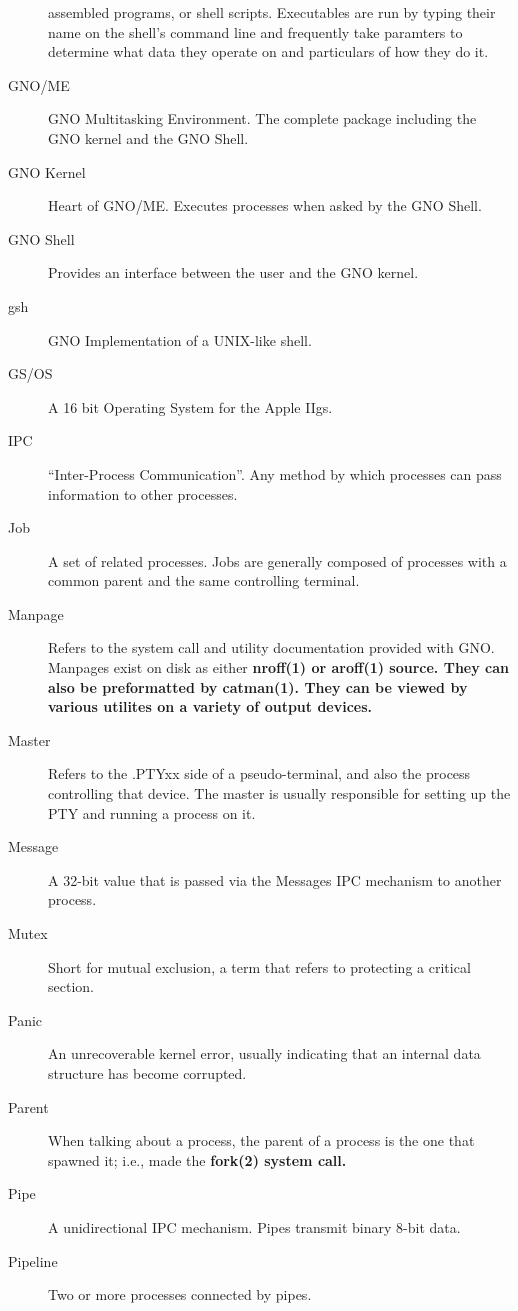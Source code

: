 \documentclass{report}
\begin{document}
\begin{description}
	assembled programs, or shell scripts. Executables are run by
	typing their name on the shell's command line and frequently take
	paramters to determine what data they operate on and particulars
	of how they do it.
\item[GNO/ME]
	GNO Multitasking Environment. The complete package including the GNO
	kernel and the GNO Shell.
\item[GNO Kernel]
	Heart of GNO/ME. Executes processes when asked by the GNO Shell.
\item[GNO Shell]
	Provides an interface between the user and the GNO kernel.
\item[gsh]
	GNO Implementation of a UNIX-like shell.
\item[GS/OS]
	A 16 bit Operating System for the Apple IIgs.
\item[IPC]
	``Inter-Process Communication''. Any method by which processes
	can pass information to other processes.
\item[Job]
	A set of related processes. Jobs are generally composed of
	processes with a common parent and the same controlling terminal.
\item[Manpage]
	Refers to the system call and utility documentation provided with GNO.
	Manpages exist on disk as either \bf nroff\rm(1) or \bf aroff\rm(1)
	source.  They can also be preformatted by \bf catman\rm(1).  They
	can be viewed by various utilites on a variety of output devices.
\item[Master]
	Refers to the .PTYxx side of a pseudo-terminal, and also
	the process controlling that device. The master is usually responsible
	for setting up the PTY and running a process on it.
\item[Message]
	A 32-bit value that is passed via the Messages IPC mechanism to
	another process.
\item[Mutex]
	Short for mutual exclusion, a term that refers to protecting a
	critical section.
\item[Panic]
	An unrecoverable kernel error, usually indicating that an
	internal data structure has become corrupted.
\item[Parent]
	When talking about a process, the parent of a process is the one that
	spawned it; i.e., made the \bf fork\rm(2) system call.
\item[Pipe]
	A unidirectional IPC mechanism. Pipes transmit binary 8-bit data.
\item[Pipeline]
	Two or more processes connected by pipes.

\end{description}
\end{document}
